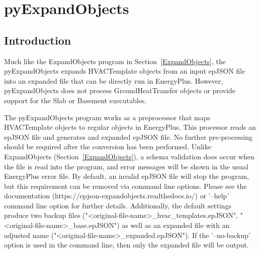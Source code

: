 \section{pyExpandObjects}

\subsection{Introduction}\label{pyExpandObjects}

Much like the ExpandObjects program in Section~\ref{ExpandObjects}, the pyExpandObjects expands HVACTemplate objects from an input epJSON file into an expanded file that can be directly run in EnergyPlus.  However, pyExpandObjects does not process GroundHeatTransfer objects or provide support for the Slab or Basement executables.

The pyExpandObjects program works as a preprocessor that maps HVACTemplate objects to regular objects in EnergyPlus.  This processor reads an epJSON file and generates and expanded epJSON file.  No further pre-processing should be required after the conversion has been performed.  Unlike ExpandObjects (Section~\ref{ExpandObjects}), a schema validation does occur when the file is read into the program, and error messages will be shown in the usual EnergyPlus error file.  By default, an invalid epJSON file will stop the program, but this requirement can be removed via command line options.  Please see the documentation (https://epjson-expandobjects.readthedocs.io/) or '--help' command line option for further details.  Additionally, the default settings produce two backup files ("<original-file-name>\_hvac\_templates.epJSON", "<original-file-name>\_base.epJSON") as well as an expanded file with an adjusted name ("<original-file-name>\_expanded.epJSON"). If the '--no-backup' option is used in the command line, then only the expanded file will be output.